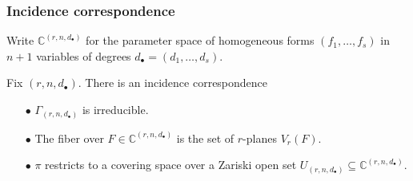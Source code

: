 \documentclass{beamer}
\begin{document}
\begin{frame}
\frametitle{Incidence correspondence}
Write $\mathbb{C}^{(r,n,d_\bullet)}$ for the parameter space of homogeneous forms $(f_1,\dotsc,f_s)$ in $n+1$ variables of degrees $d_\bullet = (d_1,\dotsc,d_s)$.

Fix $(r,n,d_\bullet)$. There is an incidence correspondence

\vspace{-.3cm}

\begin{center}
\end{center}

\vspace{-.45cm}

\begin{enumerate}
\item[$\bullet$] $\Gamma_{(r,n,d_\bullet)}$ is irreducible.

\item[$\bullet$] The fiber over $F\in\mathbb{C}^{(r,n,d_\bullet)}$ is the set of $r$-planes $V_r(F)$.

\item[$\bullet$] $\pi$ restricts to a covering space over a Zariski open set $U_{(r,n,d_\bullet)}\subseteq\mathbb{C}^{(r,n,d_\bullet)}$.

\end{enumerate}
\end{frame}
\end{document}
